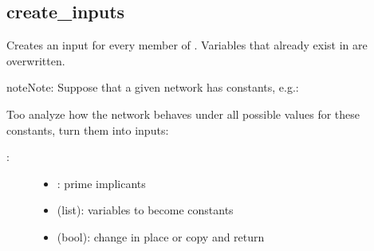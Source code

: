 \documentclass[letterpaper,10pt,english]{sphinxmanual}
\begin{document}
\subsection{create\_inputs}
\label{\detokenize{PrimeImplicants:id7}}\label{\detokenize{PrimeImplicants:create-inputs}}

\begin{fulllineitems}
\label{\detokenize{PrimeImplicants:PyBoolNet.PrimeImplicants.create_inputs}}
Creates an input for every member of .
Variables that already exist in  are overwritten.

\begin{sphinxadmonition}{note}{Note:}
Suppose that a given network has constants, e.g.:

\begin{sphinxVerbatim}[commandchars=\\\{\}]
\end{sphinxVerbatim}

Too analyze how the network behaves under all possible values for these constants, turn them into inputs:

\begin{sphinxVerbatim}[commandchars=\\\{\}]
  
 
\end{sphinxVerbatim}
\end{sphinxadmonition}
\begin{description}
\item[{:}] \leavevmode\begin{itemize}
\item {} 
: prime implicants

\item {} 
 (list): variables to become constants

\item {} 
 (bool): change  in place or copy and return


\end{itemize}
\end{description}
\end{fulllineitems}
\end{document}
